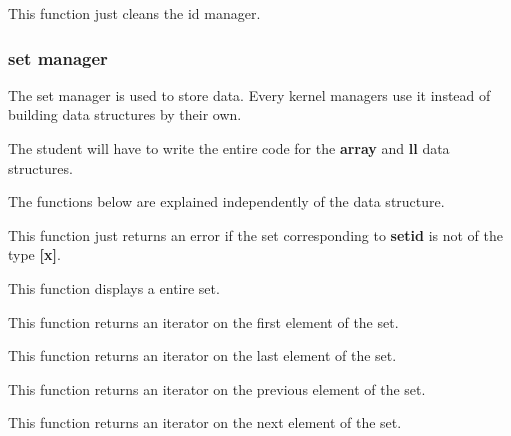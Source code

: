 
This function just cleans the id manager.

%
%

\subsubsection{set manager}

The set manager is used to store data. Every kernel managers use it
instead of building data structures by their own.

The student will have to write the entire code for the \textbf{array} and
\textbf{ll} data structures.

The functions below are explained independently of the data structure.


This function just returns an error if the set corresponding to
\textbf{setid} is not of the type \textbf{[x]}.


This function displays a entire set.


This function returns an iterator on the first element of the set.


This function returns an iterator on the last element of the set.


This function returns an iterator on the previous element of the set.


This function returns an iterator on the next element of the set.

